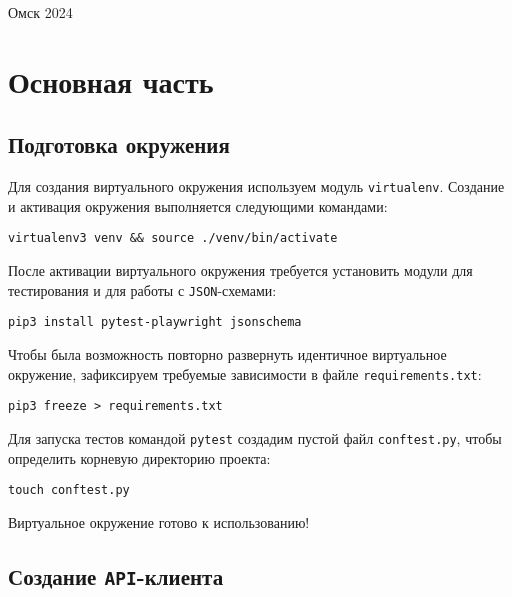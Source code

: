 \documentclass[a4paper]{article}
\begin{document}
    \vspace*{\fill}
    \begin{center}
        Омск 2024
    \end{center}

    \newpage

    \tableofcontents

    \newpage

    \section{Основная часть}

    \subsection{Подготовка окружения}

    Для создания виртуального окружения используем модуль \texttt{virtualenv}.
    Создание и активация окружения выполняется следующими командами:

    \begin{verbatim}
virtualenv3 venv && source ./venv/bin/activate    
    \end{verbatim}

    После активации виртуального окружения требуется установить модули для тестирования
    и для работы с \texttt{JSON}-схемами:

    \begin{verbatim}
pip3 install pytest-playwright jsonschema
    \end{verbatim}

    Чтобы была возможность повторно развернуть идентичное виртуальное окружение,
    зафиксируем требуемые зависимости в файле \texttt{requirements.txt}:

    \begin{verbatim}
pip3 freeze > requirements.txt
    \end{verbatim}

    Для запуска тестов командой \texttt{pytest} создадим пустой файл \texttt{conftest.py},
    чтобы определить корневую директорию проекта:

    \begin{verbatim}
touch conftest.py
    \end{verbatim}

    Виртуальное окружение готово к использованию!

    \subsection{Создание \texttt{API}-клиента}
\end{document}
